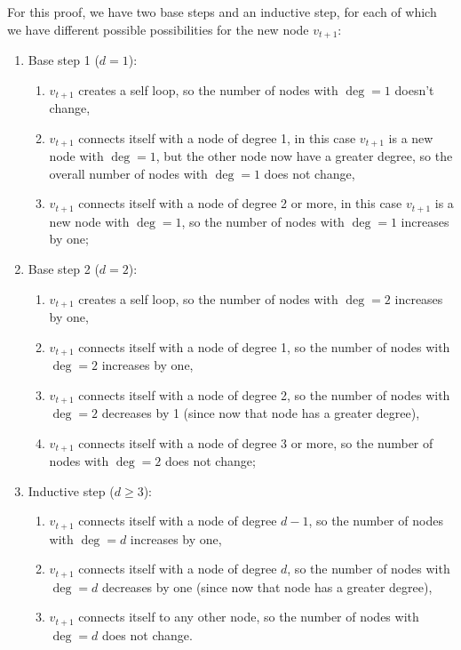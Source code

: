     For this proof, we have two base steps and an inductive step, for each of which we have different possible possibilities for the new node $v_{t+1}$:
    \begin{enumerate}
        \item Base step 1 ($d = 1$):
            \begin{enumerate}
                \item $v_{t+1}$ creates a self loop, so the number of nodes with $\deg=1$ doesn't change,
                \item $v_{t+1}$ connects itself with a node of degree 1, in this case $v_{t+1}$ is a new node with $\deg=1$, but the other node now have a greater degree, so the overall number of nodes with $\deg=1$ does not change,
                \item $v_{t+1}$ connects itself with a node of degree 2 or more, in this case $v_{t+1}$ is a new node with $\deg=1$, so the number of nodes with $\deg=1$ increases by one;
            \end{enumerate}
        \item Base step 2 ($d = 2$):
            \begin{enumerate}
                \item $v_{t+1}$ creates a self loop, so the number of nodes with $\deg=2$ increases by one,
                \item $v_{t+1}$ connects itself with a node of degree 1, so the number of nodes with $\deg=2$ increases by one,
                \item $v_{t+1}$ connects itself with a node of degree 2, so the number of nodes with $\deg=2$ decreases by 1 (since now that node has a greater degree),
                \item $v_{t+1}$ connects itself with a node of degree 3 or more, so the number of nodes with $\deg=2$ does not change;
            \end{enumerate}
        \item Inductive step ($d \geq 3$):
            \begin{enumerate}
                \item $v_{t+1}$ connects itself with a node of degree $d-1$, so the number of nodes with $\deg=d$ increases by one,
                \item $v_{t+1}$ connects itself with a node of degree $d$, so the number of nodes with $\deg=d$ decreases by one (since now that node has a greater degree),
                \item $v_{t+1}$ connects itself to any other node, so the number of nodes with $\deg=d$ does not change.
            \end{enumerate}
    \end{enumerate}
    
